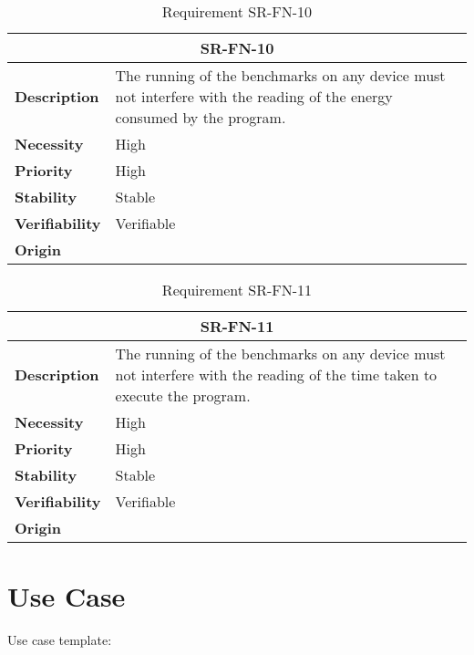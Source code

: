 \begin{table}[H]
    \centering
    \begin{tabular}{l p{10cm}}
        \toprule
        \multicolumn{2}{c}{SR-FN-10} \\
        \toprule
        \textbf{Description}        &  The running of the benchmarks on any device must not interfere with the reading of the energy consumed by the program. \\
        \textbf{Necessity}          &  High \\
        \textbf{Priority}           &  High \\
        \textbf{Stability}          &  Stable \\
        \textbf{Verifiability}      & Verifiable \\
        \textbf{Origin}             & \textit{\nameref{tab:ur-ca-09}} \\
    \end{tabular}
    \caption{Requirement SR-FN-10}
    \label{tab:sr-fn-10}
\end{table}

\begin{table}[H]
    \centering
    \begin{tabular}{l p{10cm}}
        \toprule
        \multicolumn{2}{c}{SR-FN-11} \\
        \toprule
        \textbf{Description}        &  The running of the benchmarks on any device must not interfere with the reading of the time taken to execute the program. \\
        \textbf{Necessity}          &  High \\
        \textbf{Priority}           &  High \\
        \textbf{Stability}          &  Stable \\
        \textbf{Verifiability}      & Verifiable \\
        \textbf{Origin}             & \textit{\nameref{tab:ur-ca-09}} \\
    \end{tabular}
    \caption{Requirement SR-FN-11}
    \label{tab:sr-fn-11}
\end{table}

\section{Use Case}
\checkmark



Use case template:

